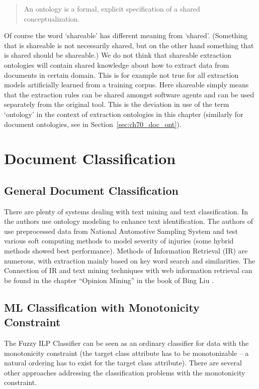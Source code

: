 \begin{quote}
An ontology is a formal, explicit specification of a shared conceptualization. \citep{Studer1998161}
\end{quote}

Of course the word `shareable' has different meaning from `shared'. (Something that is shareable is not necessarily shared, but on the other hand something that is shared should be shareable.) We do not think that shareable extraction ontologies will contain shared knowledge about how to extract data from documents in certain domain. This is for example not true for all extraction models artificially learned from a training corpus. Here shareable simply means that the extraction rules can be shared amongst software agents and can be used separately from the original tool. This is the deviation in use of the term `ontology' in the context of extraction ontologies in this chapter (similarly for document ontologies, see in Section~\ref{sec:ch70_doc_ont}).






\section{Document Classification} \label{sec:ch20_doc_classification}

\subsection{General Document Classification}

There are plenty of systems dealing with text mining and text classification. In \citep{biblio:ReYaLiOntoText08} the authors use ontology modeling to enhance text identification. The authors of \citep{biblio:CAP} use preprocessed data from National Automotive Sampling System and test various soft computing methods to model severity of injuries (some hybrid methods showed best performance). Methods of Information Retrieval (IR) are numerous, with extraction mainly based on key word search and similarities. The Connection of IR and text mining techniques with web information retrieval can be found in the chapter ``Opinion Mining'' in the book of Bing Liu \citep{biblio:WebDataMining}. 

\subsection{ML Classification with Monotonicity Constraint}
The Fuzzy ILP Classifier can be seen as an ordinary classifier for data with the monotonicity constraint (the target class attribute has to be monotonizable -- a natural ordering has to exist for the target class attribute). There are several other approaches addressing the classification problems with the monotonicity constraint.

